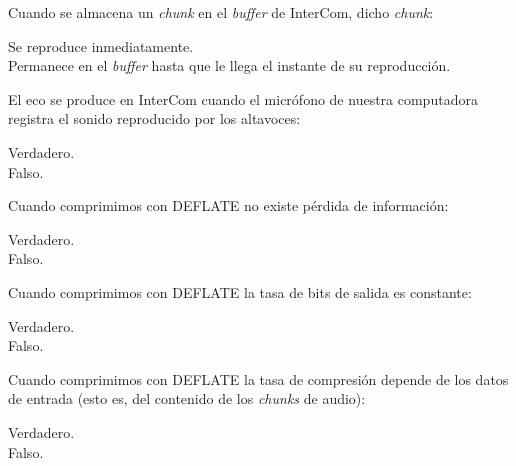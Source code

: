 \documentclass[legalpaper, 12pt, addpoints]{exam}
\begin{document}
\begin{questions}
\vspace{0.10in}

\question Cuando se almacena un \emph{chunk} en el \emph{buffer} de InterCom, dicho \emph{chunk}:

\begin{oneparchoices}
  \choice Se reproduce inmediatamente.\\
  \choice Permanece en el \emph{buffer} hasta que le llega el instante de su reproducción.
\end{oneparchoices}
  
\vspace{0.10in}

\question El eco se produce en InterCom cuando el micrófono de nuestra computadora registra el sonido reproducido por los altavoces:

\begin{oneparchoices}
  \choice Verdadero.\\
  \choice Falso.
\end{oneparchoices}
  
\vspace{0.10in}

\question Cuando comprimimos con DEFLATE no existe pérdida de información:

\begin{oneparchoices}
  \choice Verdadero.\\
  \choice Falso.
\end{oneparchoices}
  
\vspace{0.10in}

\question Cuando comprimimos con DEFLATE la tasa de bits de salida es constante:

\begin{oneparchoices}
  \choice Verdadero.\\
  \choice Falso.
\end{oneparchoices}
  
\vspace{0.10in}

\question Cuando comprimimos con DEFLATE la tasa de compresión depende
de los datos de entrada (esto es, del contenido de los \emph{chunks} de
audio):

\begin{oneparchoices}
  \choice Verdadero.\\
  \choice Falso.
\end{oneparchoices}
  
\vspace{0.10in}


\end{questions}
\end{document}
